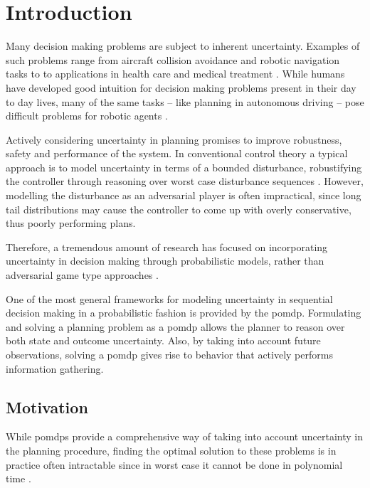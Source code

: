 \chapter{Introduction}\label{chap:introduction}


Many decision making problems are subject to inherent uncertainty. Examples of
such problems range from aircraft collision avoidance and robotic navigation
tasks to to applications in health care and medical treatment
\cite{kochenderfer2012next, bandyopadhyay2013intention, pineau2003towards,
schaefer2005modeling}. While humans have developed good intuition for decision
making problems present in their day to day lives, many of the same tasks --
like planning in autonomous driving -- pose difficult problems for robotic
agents \cite{levinson2011towards}.

Actively considering uncertainty in planning promises to improve robustness,
safety and performance of the system. In conventional control theory a typical
approach is to model uncertainty in terms of a bounded disturbance,
robustifying the controller through reasoning over worst case disturbance
sequences \cite{petersen2012robust}. However, modelling the disturbance as an
adversarial player is often impractical, since long tail distributions may
cause the controller to come up with overly conservative, thus poorly
performing plans.

Therefore, a tremendous amount of research has focused on incorporating
uncertainty in decision making through probabilistic models, rather than
adversarial game type approaches \cite{roy1999coastal, amato2015planning,
fisac2018probabilistically, choudhury2019dynamic}.

One of the most general frameworks for modeling uncertainty in sequential
decision making in a probabilistic fashion is provided by the \ac{pomdp}.
Formulating and solving a planning problem as a \ac{pomdp} allows the planner
to reason over both state and outcome uncertainty. Also, by taking into
account future observations, solving a \ac{pomdp} gives rise to behavior that actively performs information gathering.

\section{Motivation}\label{sec:motivation}

While \acp{pomdp} provide a comprehensive way of taking into account
uncertainty in the planning procedure, finding the optimal solution to these
problems is in practice often intractable since in worst case it cannot be
done in polynomial time \cite{papadimitriou1987complexity}.

